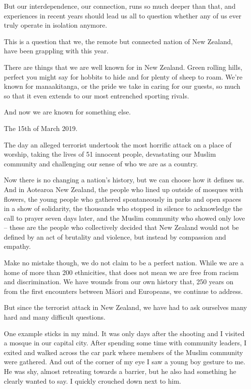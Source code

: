 \documentclass[10pt,a4paper]{article}
\begin{document}
But our interdependence, our connection, runs so much deeper than that, and experiences in recent years should lead us all to question whether any of us ever truly operate in isolation anymore.

This is a question that we, the remote but connected nation of New Zealand, have been grappling with this year.

There are things that we are well known for in New Zealand. Green rolling hills, perfect you might say for hobbits to hide and for plenty of sheep to roam. We’re known for manaakitanga, or the pride we take in caring for our guests, so much so that it even extends to our most entrenched sporting rivals.

And now we are known for something else.

The 15th of March 2019.

The day an alleged terrorist undertook the most horrific attack on a place of worship, taking the lives of 51 innocent people, devastating our Muslim community and challenging our sense of who we are as a country.

Now there is no changing a nation’s history, but we can choose how it defines us. And in Aotearoa New Zealand, the people who lined up outside of mosques with flowers, the young people who gathered spontaneously in parks and open spaces in a show of solidarity, the thousands who stopped in silence to acknowledge the call to prayer seven days later, and the Muslim community who showed only love – these are the people who collectively decided that New Zealand would not be defined by an act of brutality and violence, but instead by compassion and empathy.

Make no mistake though, we do not claim to be a perfect nation. While we are a home of more than 200 ethnicities, that does not mean we are free from racism and discrimination. We have wounds from our own history that, 250 years on from the first encounters between Māori and Europeans, we continue to address.

But since the terrorist attack in New Zealand, we have had to ask ourselves many hard and many difficult questions.

One example sticks in my mind. It was only days after the shooting and I visited a mosque in our capital city. After spending some time with community leaders, I exited and walked across the car park where members of the Muslim community were gathered. And out of the corner of my eye I saw a young boy gesture to me. He was shy, almost retreating towards a barrier, but he also had something he clearly wanted to say. I quickly crouched down next to him.
\end{document}
